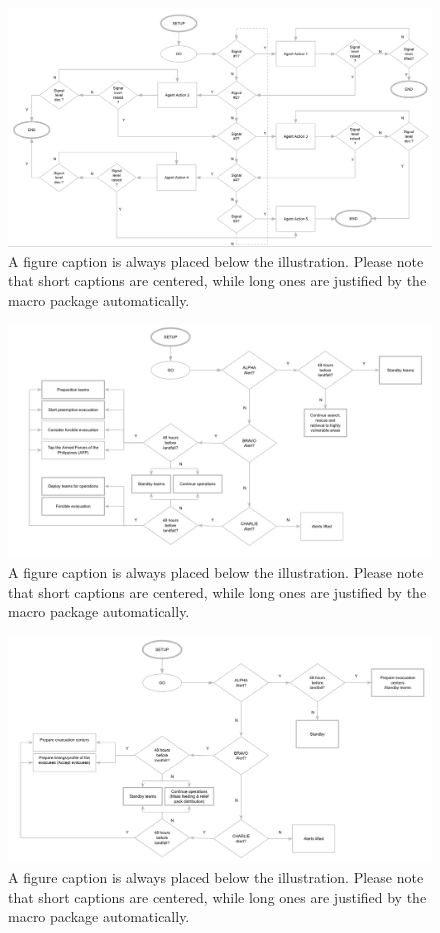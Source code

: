 \documentclass[runningheads]{llncs}
\begin{document}
\begin{figure}
\includegraphics[width=\textwidth]{_abms_gendiagram_oc.png}
\caption{A figure caption is always placed below the illustration. Please note that short captions are centered, while long ones are justified by the macro package automatically.} \label{abms_gendiagram_oc}
\end{figure}

\begin{figure}
\includegraphics[width=\textwidth]{_abms_gendiagram_rr.png}
\caption{A figure caption is always placed below the illustration. Please note that short captions are centered, while long ones are justified by the macro package automatically.} \label{abms_gendiagram_rr}
\end{figure}

\begin{figure}
\includegraphics[width=\textwidth]{_abms_gendiagram_sm.png}
\caption{A figure caption is always placed below the illustration. Please note that short captions are centered, while long ones are justified by the macro package automatically.} \label{abms_gendiagram_sm}
\end{figure}
\end{document}
